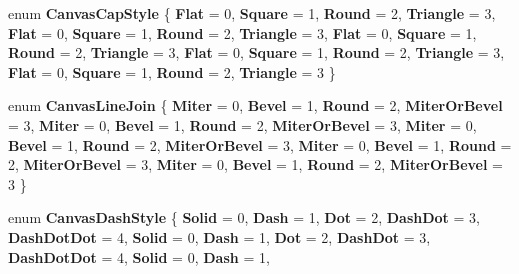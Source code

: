 \begin{DoxyCompactItemize}
enum {\bfseries Canvas\+Cap\+Style} \{ \newline
{\bfseries Flat} = 0, 
{\bfseries Square} = 1, 
{\bfseries Round} = 2, 
{\bfseries Triangle} = 3, 
\newline
{\bfseries Flat} = 0, 
{\bfseries Square} = 1, 
{\bfseries Round} = 2, 
{\bfseries Triangle} = 3, 
\newline
{\bfseries Flat} = 0, 
{\bfseries Square} = 1, 
{\bfseries Round} = 2, 
{\bfseries Triangle} = 3, 
\newline
{\bfseries Flat} = 0, 
{\bfseries Square} = 1, 
{\bfseries Round} = 2, 
{\bfseries Triangle} = 3, 
\newline
{\bfseries Flat} = 0, 
{\bfseries Square} = 1, 
{\bfseries Round} = 2, 
{\bfseries Triangle} = 3
 \}
\item 
\mbox{\label{namespace_microsoft_1_1_graphics_1_1_canvas_1_1_geometry_a962f9c8c901a160f4a74f2be716840d7}} 
enum {\bfseries Canvas\+Line\+Join} \{ \newline
{\bfseries Miter} = 0, 
{\bfseries Bevel} = 1, 
{\bfseries Round} = 2, 
{\bfseries Miter\+Or\+Bevel} = 3, 
\newline
{\bfseries Miter} = 0, 
{\bfseries Bevel} = 1, 
{\bfseries Round} = 2, 
{\bfseries Miter\+Or\+Bevel} = 3, 
\newline
{\bfseries Miter} = 0, 
{\bfseries Bevel} = 1, 
{\bfseries Round} = 2, 
{\bfseries Miter\+Or\+Bevel} = 3, 
\newline
{\bfseries Miter} = 0, 
{\bfseries Bevel} = 1, 
{\bfseries Round} = 2, 
{\bfseries Miter\+Or\+Bevel} = 3, 
\newline
{\bfseries Miter} = 0, 
{\bfseries Bevel} = 1, 
{\bfseries Round} = 2, 
{\bfseries Miter\+Or\+Bevel} = 3
 \}
\item 
\mbox{\label{namespace_microsoft_1_1_graphics_1_1_canvas_1_1_geometry_ab285a1e0da5c91c32bbb2fbbec7ad1c0}} 
enum {\bfseries Canvas\+Dash\+Style} \{ \newline
{\bfseries Solid} = 0, 
{\bfseries Dash} = 1, 
{\bfseries Dot} = 2, 
{\bfseries Dash\+Dot} = 3, 
\newline
{\bfseries Dash\+Dot\+Dot} = 4, 
{\bfseries Solid} = 0, 
{\bfseries Dash} = 1, 
{\bfseries Dot} = 2, 
\newline
{\bfseries Dash\+Dot} = 3, 
{\bfseries Dash\+Dot\+Dot} = 4, 
{\bfseries Solid} = 0, 
{\bfseries Dash} = 1, 

\end{DoxyCompactItemize}
